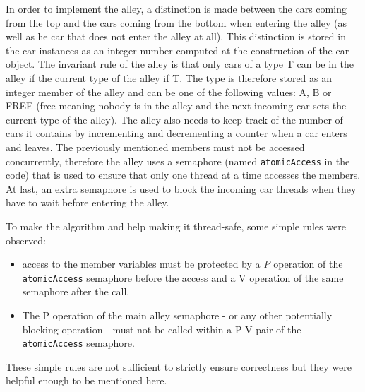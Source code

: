In order to implement the alley, a distinction is made between the cars coming
from the top and the cars coming from the bottom when entering the alley (as
well as he car that does not enter the alley at all). This distinction is stored
in the car instances as an integer number computed at the construction of the
car object. The invariant rule of the alley is that only cars of a type T can be
in the alley if the current type of the alley if T. The type is therefore stored
as an integer member of the alley and can be one of the following values: A, B
or FREE (free meaning nobody is in the alley and the next incoming car sets the
current type of the alley). The alley also needs to keep track of the number of
cars it contains by incrementing and decrementing a counter when a car enters
and leaves. The previously mentioned members must not be accessed concurrently,
therefore the alley uses a semaphore (named \texttt{atomicAccess} in the code)
that is used to ensure that only one thread at a time accesses the members. At
last, an extra semaphore is used to block the incoming car threads when they 
have to wait before entering the alley.

To make the algorithm and help making it thread-safe, some simple rules were
observed:
\begin{itemize}
    \item access to the member variables must be protected by a \textit{P}
    operation of the \texttt{atomicAccess} semaphore before the access and a
    V operation of the same semaphore after the call.
    \item The P operation of the main alley semaphore - or any other
    potentially blocking operation - must not be called within a P-V pair 
    of the \texttt{atomicAccess} semaphore.
\end{itemize}

These simple rules are not sufficient to strictly ensure correctness but they
were helpful enough to be mentioned here.

